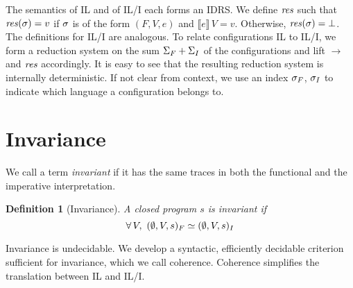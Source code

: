 \documentclass[openright,a4paper,11pt]{scrartcl}
\newcommand{\denot}[1]{\ensuremath{\llbracket #1 \rrbracket}}
\newcommand{\fevals}{\ensuremath{\longrightarrow}}
\newcommand{\red}{\ensuremath{\fevals}}
\theoremstyle{plain}
\theoremstyle{plain}
\theoremstyle{plain}
\newtheorem{definition}{Definition}
\theoremstyle{plain}
\theoremstyle{nonumberplain}
\begin{document}
The semantics of IL and of IL/I each forms an IDRS. We define $\mathit{res}$ such that $\mathit{res}(\sigma)=v$ if $\sigma$ is of the form $(F,V,e)$ and $\denot{e}\,V=v$. Otherwise, $\mathit{res}(\sigma)=\bot$. The definitions for IL/I are analogous.
To relate configurations IL to IL/I, we form a reduction system on the sum $\Sigma_F + \Sigma_I$ of the configurations and lift $\red$ and $\mathit{res}$ accordingly.
It is easy to see that the resulting reduction system is internally deterministic.
If not clear from context, we use an index $\sigma_F$, $\sigma_I$ to indicate which language a configuration belongs to.







































 \section{Invariance}
\label{sec:invariance}
We call a term \emph{invariant} if it has the same traces in both the functional and the imperative interpretation.

\begin{definition}[Invariance]
\label{def:invariance}
A closed program $s$ is invariant if$$\forall\, V,~(\emptyset,V,s)_F \simeq (\emptyset,V,s)_I$$\end{definition}
Invariance is undecidable.
We develop a syntactic, efficiently decidable criterion sufficient for invariance, which we call coherence.
Coherence simplifies the translation between IL and IL/I.
\end{document}
